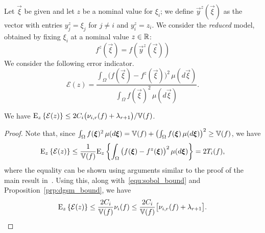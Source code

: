 Let $\vec\xi$ be given and let $z$ be a nominal value for $\xi_i$;  we define 
$\vec{y}^z(\vec\xi)$ as the vector with entries $y^z_j = \xi_j$ for $j \neq i$
and $y^z_i = z_i$.
We consider the \emph{reduced} model, 
obtained by fixing $\xi_i$ at a nominal value $z \in \R$: 
\[
f^{z}(\vec\xi) = f(\vec{y}^z(\vec\xi))
\] 
We consider the following error indicator.
\[
\mathcal{E}(z) =
\frac{ \int_\Omega \big( f(\vec\xi) - f^{z}(\vec\xi)\big)^2 \, \mu(d\vec\xi) }
          {\int_\Omega f(\vec\xi)^2 \, \mu(d\vec\xi)}.
\] 
\begin{theorem}
We have $\Ez{ \mathcal{E}(z)} \leq 2C_i\big(\act{f}{i}{r} + \lambda_{r+1}\big)/{\V(f)} $.
\end{theorem}
%
\begin{proof} 
Note that, since 
$\int_\Omega f(\vec\xi)^2 \, \mu(d\vec\xi) = \V(f) + 
\left(\int_\Omega f(\vec\xi) \, \mu(d\vec\xi)\right)^2 \geq \V(f)$, we have
\[
\Ez{ \mathcal{E}(z)} \leq \frac{1}{\V(f)} \Ez{ 
\int_\Omega \big( f(\vec\xi) - f^{z}(\vec\xi)\big)^2 \, \mu(d\vec\xi)}
= 2 T_i(f), 
\]
where the equality can be shown using arguments similar to the proof of the main result 
in~\cite{SobolTarantolaGatelliEtAl07}. Using this, along with~\eqref{equ:sobol_bound} and
Proposition~\ref{prp:dgsm_bound}, we have 
\[
\Ez{ \mathcal{E}(z)} \leq 
\frac{2C_i}{\V(f)}\nu_i(f)
\leq 
\frac{2C_i}{\V(f)}\big[\act{f}{i}{r} + \lambda_{r+1}\big]. \qedhere
\]
\end{proof}


